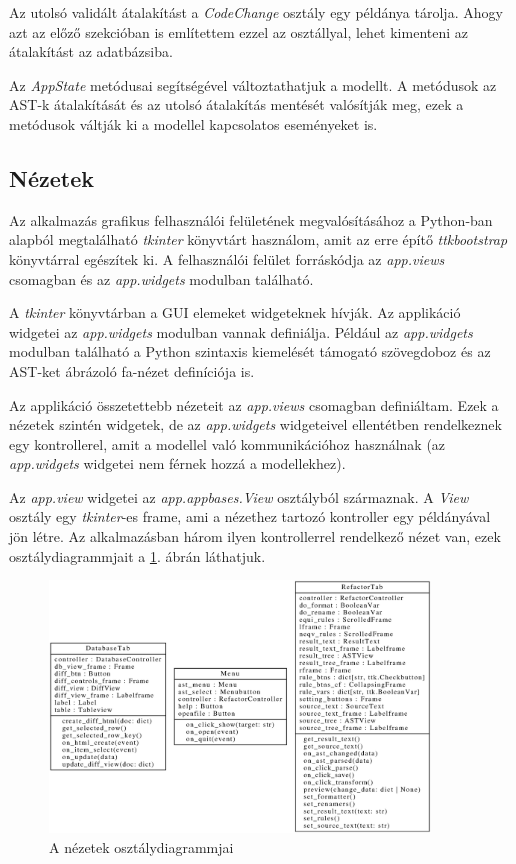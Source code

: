 \pagebreak

Az utolsó validált átalakítást a \emph{CodeChange} osztály egy példánya tárolja.
Ahogy azt az előző szekcióban is említettem ezzel az osztállyal,
lehet kimenteni az átalakítást az adatbázsiba.

Az \emph{AppState} metódusai segítségével változtathatjuk a modellt.
A metódusok az AST-k átalakítását és az utolsó átalakítás mentését valósítják meg,
ezek a metódusok váltják ki a modellel kapcsolatos eseményeket is.

\subsection{Nézetek}

Az alkalmazás grafikus felhasználói felületének megvalósításához
a Python-ban alapból megtalálható
\emph{tkinter} könyvtárt használom, amit az erre építő \emph{ttkbootstrap} könyvtárral
egészítek ki.
A felhasználói felület forráskódja az \emph{app.views} csomagban és az \emph{app.widgets}
modulban található.

A \emph{tkinter} könyvtárban a GUI elemeket widgeteknek hívják.
Az applikáció widgetei az \emph{app.widgets} modulban vannak definiálja.
Például az \emph{app.widgets} modulban található
a Python szintaxis kiemelését támogató szövegdoboz
és az AST-ket ábrázoló fa-nézet definíciója is.

Az applikáció összetettebb nézeteit az \emph{app.views} csomagban definiáltam.
Ezek a nézetek szintén widgetek,
de az \emph{app.widgets} widgeteivel ellentétben
rendelkeznek egy kontrollerel,
amit a modellel való kommunikációhoz használnak
(az \emph{app.widgets} widgetei nem férnek hozzá a modellekhez).

Az \emph{app.view} widgetei az \emph{app.appbases.View} osztályból származnak.
A \emph{View} osztály egy \emph{tkinter}-es frame, ami
a nézethez tartozó kontroller egy példányával jön létre.
Az alkalmazásban három ilyen kontrollerrel rendelkező nézet van,
ezek osztálydiagrammjait a \ref{fig:views}. ábrán láthatjuk.

\begin{figure}[H]
	\centering
	\includegraphics[width=0.9\textwidth]{images/uml/views.eps}
	\caption{\label{fig:views}A nézetek osztálydiagrammjai}
\end{figure}

